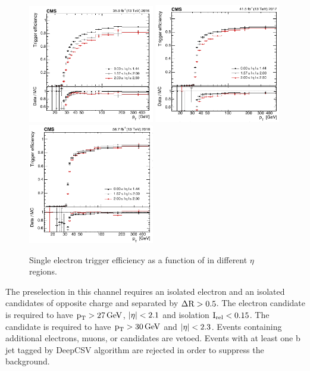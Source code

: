\begin{figure}[!htpb]
  \centering
  \captionsetup{width=0.98\textwidth,justification=centering}
  \includegraphics[width=0.49\textwidth]{plots/chapter5/2016.png}
  \includegraphics[width=0.49\textwidth]{plots/chapter5/2017.png} \\
  \includegraphics[width=0.49\textwidth]{plots/chapter5/2018.png}
  \caption{Single electron trigger efficiency as a function of \pt in different $\eta$ regions.}
  \label{fig:triggereff}
\end{figure}

The  preselection in this channel requires an isolated electron and an isolated \tauh candidates of opposite charge and separated by $\Delta \text{R} > 0.5$. The electron candidate is required to have $\text{p}_\text{T} > 27 \,\text{Ge\hspace{-.08em}V}$, $\lvert\eta\rvert < 2.1$ and isolation $\text{I}_\text{rel} < 0.15$. The \tauh candidate is required to have $\text{p}_\text{T} > 30 \,\text{Ge\hspace{-.08em}V}$ and $\lvert\eta\rvert < 2.3$. Events containing additional electrons, muons, or \tauh candidates are vetoed. Events with at least one b jet tagged by DeepCSV algorithm are rejected in order to suppress the \ttbar background.

